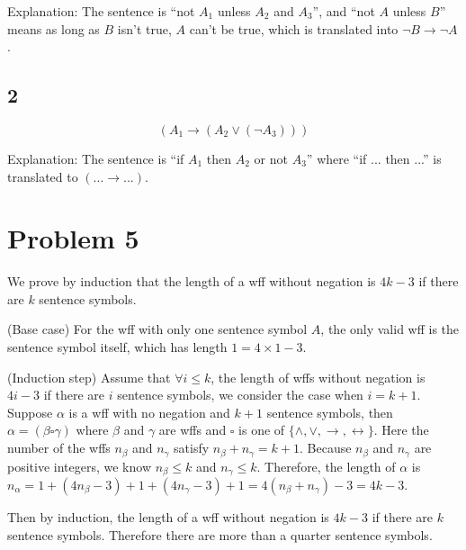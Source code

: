\documentclass{article}
\begin{document}
Explanation: The sentence is ``not $A_1$ unless $A_2$ and $A_3$'', and ``not $A$ unless $B$'' means as long as $B$ isn't true, $A$ can't be true, which is translated into $\neg B \to \neg A$.

\subsection*{2}

\begin{equation}
\left( A_1 \to \left( A_2 \lor \left( \neg A_3 \right) \right) \right)
\end{equation}

Explanation: The sentence is ``if $A_1$ then $A_2$ or not $A_3$'' where ``if ... then ...'' is translated to $(... \to ...)$.



\section*{Problem 5}

We prove by induction that the length of a wff without negation is $4k-3$ if there are $k$ sentence symbols.

(Base case) For the wff with only one sentence symbol $A$, the only valid wff is the sentence symbol itself, which has length $1=4\times 1-3$.

(Induction step) Assume that $\forall i \le k$, the length of wffs without negation is $4i-3$ if there are $i$ sentence symbols, we consider the case when $i=k+1$. Suppose $\alpha$ is a wff with no negation and $k+1$ sentence symbols, then $\alpha = ( \beta \square \gamma )$ where $\beta$ and $\gamma$ are wffs and $\square$ is one of $\{ \land, \lor, \to, \leftrightarrow \}$. Here the number of the wffs $n_{\beta}$ and $n_{\gamma}$ satisfy $n_{\beta}+n_{\gamma} = k+1$. Because $n_{\beta}$ and $n_{\gamma}$ are positive integers, we know $n_{\beta} \le k$ and $n_{\gamma} \le k$. Therefore, the length of $\alpha$ is $n_{\alpha}=1+(4n_{\beta}-3)+1+(4n_{\gamma}-3)+1=4(n_{\beta}+n_{\gamma})-3=4k-3$.

Then by induction, the length of a wff without negation is $4k-3$ if there are $k$ sentence symbols. Therefore there are more than a quarter sentence symbols.
\end{document}
